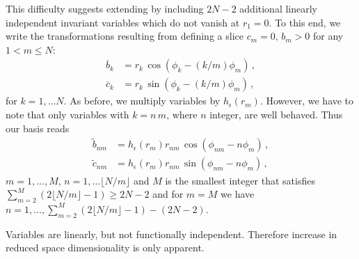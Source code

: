 \documentclass[aip,cha,showpacs,reprint]{revtex4-1} %
\begin{document}
This difficulty suggests extending  by including $2N-2$ additional linearly
independent invariant variables which do not vanish at $r_1=0$. To this end, we write
the transformations resulting from defining a slice $c_m=0,\, b_m>0$ for any $1<m\leq N$:
\bseq\label{eq:SO2polarAny}
  \begin{align}
    \overline{b}_k &=
		    r_k\, \cos\left(\phi_k-\left(k/m\right)\phi_m\right)\,, \label{eq:SO2polarAny1}\\
    \overline{c}_k &=
		    r_k\, \sin\left(\phi_k-\left(k/m\right)\phi_m\right)\,,\label{eq:SO2polarAny2}
  \end{align}
\eseq
for $k=1,\ldots N$. As before, we multiply variables  by $h_\epsilon(r_m)$.
However, we have to note that only variables with $k=n\,m$, where $n$ integer, are well behaved.
Thus our basis reads
\bseq\label{eq:SO2polarExt}
\begin{align}
  \tilde{b}_{nm} &=
		  h_\epsilon(r_m)r_{nm}\, \cos\left(\phi_{nm}-n\phi_m\right)\,, \label{eq:SO2polarAny1}\\
  \tilde{c}_{nm} &=
		  h_\epsilon(r_m)r_{nm}\, \sin\left(\phi_{nm}-n\phi_m\right)\,,\label{eq:SO2polarAny2}
\end{align}
\eseq
$m=1,...,M$, $n=1,\ldots\lfloor N/m\rfloor$ and $M$ is the smallest integer that
satisfies $\sum_{m=2}^M(2\lfloor N/m\rfloor-1)\geq2N-2$ and for
$m=M$ we have $n=1,\ldots,\sum_{m=2}^M(2\lfloor N/m\rfloor-1)-(2N-2)$.


Variables  are linearly, but not functionally independent. Therefore increase
in reduced space dimensionality is only apparent.
\end{document}
